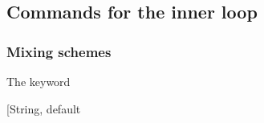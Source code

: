 \documentclass[letterpaper,10pt,english]{sphinxmanual}
\begin{document}
\subsection{Commands for the inner loop}
\label{\detokenize{onetep_kernel_diis_documentation:commands-for-the-inner-loop}}

\subsubsection{Mixing schemes}
\label{\detokenize{onetep_kernel_diis_documentation:mixing-schemes}}
\begin{DUlineblock}{0em}
\item[] The keyword
\item[]   {[}String, default \sphinxcode{kernel\_diis\_scheme: NONE}{]}
\end{DUlineblock}
\end{document}
